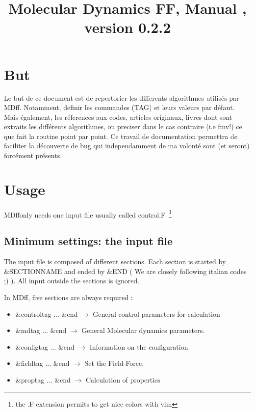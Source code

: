 \documentclass[10pt,a4paper]{article}
\title{Molecular Dynamics FF, Manual , version 0.2.2}
\newcommand{\MDFF}{{\sc MDff}}
\newcommand{\FMV}{{\sc fmv}}
\begin{document}
\maketitle

\clearpage

\section{But}

Le but de ce document est de repertorier les differents 
algorithmes utilis\'es par \MDFF. Notamment, definir les 
commandes (TAG) et leurs valeurs par défaut. Mais également, 
les r\'eferences aux codes, articles originaux, livres dont 
sont extraits les diff\'erents algorithmes, ou preciser dans 
le cas contraire (i.e \FMV!) ce que fait la routine point par point. 
Ce travail de documentation permettra de faciliter la d\'ecouverte
de bug qui independamment de ma volont\'e sont (et seront) 
forc\'ement pr\'esents. 

\clearpage


\section{Usage}

\MDFF only needs one input file usually called control.F~\footnote{the .F extension permits to get nice colors with vim} 

\subsection{Minimum settings: the input file}

The input file is composed of different sections. 
Each section is started by \&SECTIONNAME and ended by \&END ( We are closely following italian codes ;) ).
All input outside the sections is ignored.


In \MDFF, five sections are always required :

\begin{itemize}
\item \&controltag ... \&end $\rightarrow$ General control parameters for calculation 
\item \&mdtag ... \&end      $\rightarrow$ General Molecular dynamics parameters.
\item \&configtag ... \&end  $\rightarrow$ Information on the configuration
\item \&fieldtag ... \&end   $\rightarrow$ Set the Field-Force.
\item \&proptag ... \&end    $\rightarrow$ Calculation of properties
\end{itemize}
\end{document}
